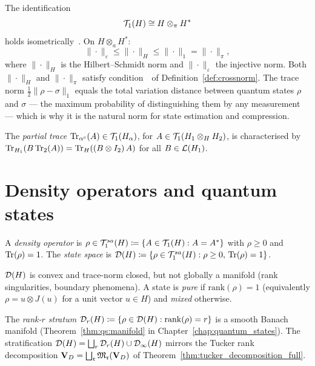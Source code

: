 \begin{remark}
\label{rem:app:trace_projective}
The identification
\begin{equation}
\label{eq:app:tc_iso}
    \mathcal{T}_{1}(H) \cong H \otimes_\pi H^*
\end{equation}
holds isometrically~\cite{Grothendieck1953,Ryan2002}. On $H \otimes_a H^*$:
\begin{equation*}
    \|\cdot\|_\varepsilon \leq \|\cdot\|_H \leq \|\cdot\|_1 = \|\cdot\|_\pi,
\end{equation*}
where $\|\cdot\|_H$ is the Hilbert--Schmidt norm and $\|\cdot\|_\varepsilon$
the injective norm. Both $\|\cdot\|_H$ and $\|\cdot\|_\pi$ satisfy
condition~\condINJ\ of Definition~\ref{def:crossnorm}. The trace norm
$\frac{1}{2}\|\rho - \sigma\|_1$ equals the total variation distance
between quantum states $\rho$ and $\sigma$ — the maximum probability
of distinguishing them by any measurement — which is why it is the
natural norm for state estimation and compression.
\end{remark}

The \emph{partial trace} $\mathrm{Tr}_{\alpha^c}(A) \in \mathcal{T}_{1}(H_\alpha)$,
for $A \in \mathcal{T}_{1}(H_1 \otimes_H H_2)$, is characterised by
$\mathrm{Tr}_{H_1}(B\, \mathrm{Tr}_{2}(A)) = \mathrm{Tr}_H((B \otimes I_2)\, A)$
for all $B \in \mathcal{L}(H_1)$.

\section{Density operators and quantum states}
\label{app:quantum:states}

\begin{definition}
\label{def:app:density}
A \emph{density operator} is $\rho \in \mathcal{T}_{1}^{sa}(H) \coloneqq
\{A \in \mathcal{T}_{1}(H) : A = A^*\}$ with $\rho \geq 0$ and $\mathrm{Tr}(\rho)=1$.
The \emph{state space} is $\mathcal{D}(H) \coloneqq \{\rho \in \mathcal{T}_{1}^{sa}(H)
: \rho \geq 0,\, \mathrm{Tr}(\rho)=1\}$.
\end{definition}

$\mathcal{D}(H)$ is convex and trace-norm closed, but not globally a
manifold (rank singularities, boundary phenomena).
A state is \emph{pure} if $\mathrm{rank}(\rho)=1$ (equivalently
$\rho = u \otimes J(u)$ for a unit vector $u \in H$) and \emph{mixed}
otherwise.

\medskip\noindent
The \emph{rank-$r$ stratum} $\mathcal{D}_{r}(H) \coloneqq \{\rho \in \mathcal{D}(H):
\mathrm{rank}(\rho)=r\}$ is a smooth Banach manifold (Theorem~\ref{thm:qs:manifold}
in Chapter~\ref{chap:quantum_states}).
The stratification $\mathcal{D}(H) = \bigsqcup_r \mathcal{D}_{r}(H) \cup
\mathcal{D}_\infty(H)$ mirrors the Tucker rank decomposition
$\mathbf{V}_D = \bigsqcup_{\mathfrak{r}} \mathfrak{M}_{\mathfrak{r}}(\mathbf{V}_D)$ of
Theorem~\ref{thm:tucker_decomposition_full}.

